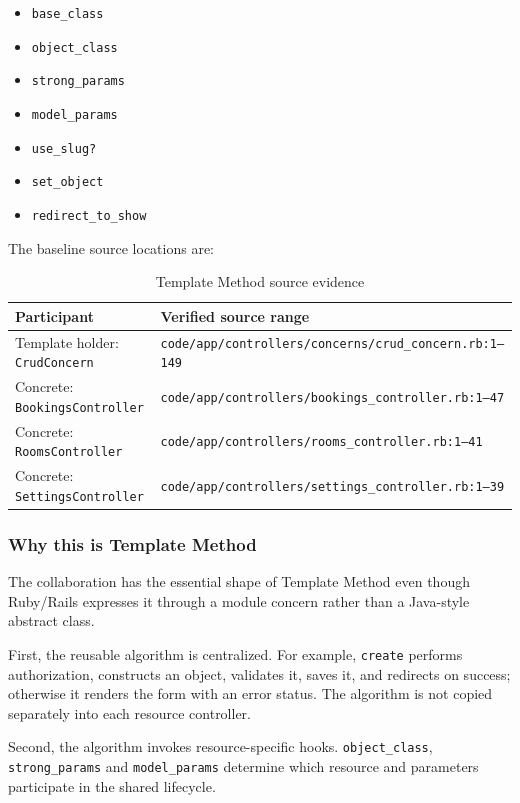 \documentclass[10pt,a4paper]{article}
\newcommand{\code}[1]{\texttt{\small #1}}
\begin{document}
\begin{itemize}[leftmargin=*]
\item \code{base\_class}
\item \code{object\_class}
\item \code{strong\_params}
\item \code{model\_params}
\item \code{use\_slug?}
\item \code{set\_object}
\item \code{redirect\_to\_show}
\end{itemize}

The baseline source locations are:

\begin{table}[H]
\centering
\caption{Template Method source evidence}
\label{tab:tm-evidence}
\begin{tabularx}{\linewidth}{lX}
\toprule
Participant & Verified source range\\
\midrule
Template holder: \code{CrudConcern} & \code{code/app/controllers/concerns/crud\_concern.rb:1--149}\\
Concrete: \code{BookingsController} & \code{code/app/controllers/bookings\_controller.rb:1--47}\\
Concrete: \code{RoomsController} & \code{code/app/controllers/rooms\_controller.rb:1--41}\\
Concrete: \code{SettingsController} & \code{code/app/controllers/settings\_controller.rb:1--39}\\
\bottomrule
\end{tabularx}
\end{table}

\subsubsection{Why this is Template Method}

The collaboration has the essential shape of Template Method even though Ruby/Rails expresses it through a module concern rather than a Java-style abstract class.

First, the reusable algorithm is centralized. For example, \code{create} performs authorization, constructs an object, validates it, saves it, and redirects on success; otherwise it renders the form with an error status. The algorithm is not copied separately into each resource controller.

Second, the algorithm invokes resource-specific hooks. \code{object\_class}, \code{strong\_params} and \code{model\_params} determine which resource and parameters participate in the shared lifecycle.
\end{document}

